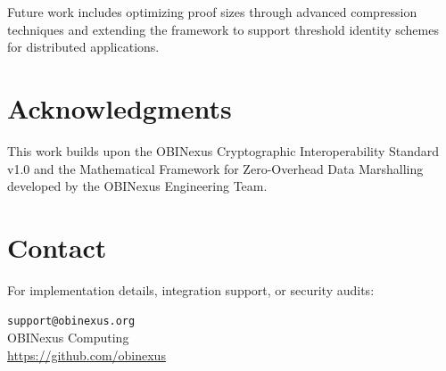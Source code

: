 \documentclass[11pt]{article}
\theoremstyle{definition}
\begin{document}
Future work includes optimizing proof sizes through advanced compression techniques and extending the framework to support threshold identity schemes for distributed applications.

\section*{Acknowledgments}

This work builds upon the OBINexus Cryptographic Interoperability Standard v1.0 and the Mathematical Framework for Zero-Overhead Data Marshalling developed by the OBINexus Engineering Team.

\section*{Contact}

For implementation details, integration support, or security audits:

\begin{center}
\texttt{support@obinexus.org}\\
OBINexus Computing\\
\url{https://github.com/obinexus}
\end{center}
\end{document}
